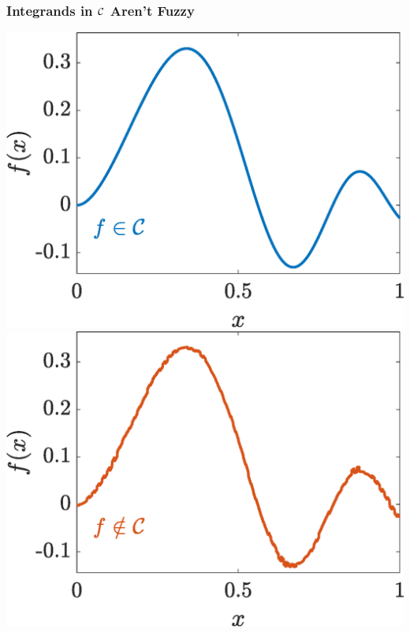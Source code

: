 \documentclass[11pt,compress,xcolor={usenames,dvipsnames},aspectratio=169]{beamer}
\newlength{\figwidth}
\begin{document}
\begin{frame}
\frametitle{Integrands in $\mathcal{C}$ Aren't Fuzzy}

\setlength{\figwidth}{0.4\textwidth}

\vspace{-6ex}


\centerline{
	\includegraphics[width = \figwidth] 
	{ProgramsImages/FunctionWalshFourierCoeffDecay.eps} \qquad \qquad
	\includegraphics[width = \figwidth] 
	{ProgramsImages/FilteredFunctionWalshFourierCoeffDecay.eps} }


\end{frame}
\end{document}
